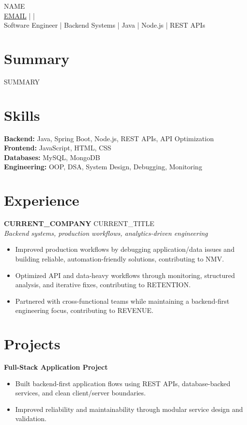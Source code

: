 \documentclass[10pt]{article}
\begin{document}
\begin{center}
{\Large {{NAME}}}\\
\href{mailto:{{EMAIL}}}{{{EMAIL}}} \quad |  \quad | \\
Software Engineer | Backend Systems | Java | Node.js | REST APIs
\end{center}

\section*{Summary}
{{SUMMARY}}

\section*{Skills}
\textbf{Backend:} Java, Spring Boot, Node.js, REST APIs, API Optimization\\
\textbf{Frontend:} JavaScript, HTML, CSS\\
\textbf{Databases:} MySQL, MongoDB\\
\textbf{Engineering:} OOP, DSA, System Design, Debugging, Monitoring

\section*{Experience}
\textbf{{{CURRENT_COMPANY}}} \hfill {{CURRENT_TITLE}}\\
\textit{Backend systems, production workflows, analytics-driven engineering}\\
\begin{itemize}
\item Improved production workflows by debugging application/data issues and building reliable, automation-friendly solutions, contributing to {{NMV}}.
\item Optimized API and data-heavy workflows through monitoring, structured analysis, and iterative fixes, contributing to {{RETENTION}}.
\item Partnered with cross-functional teams while maintaining a backend-first engineering focus, contributing to {{REVENUE}}.
\end{itemize}

\section*{Projects}
\textbf{Full-Stack Application Project}\\
\begin{itemize}
\item Built backend-first application flows using REST APIs, database-backed services, and clean client/server boundaries.
\item Improved reliability and maintainability through modular service design and validation.
\end{itemize}
\end{document}
